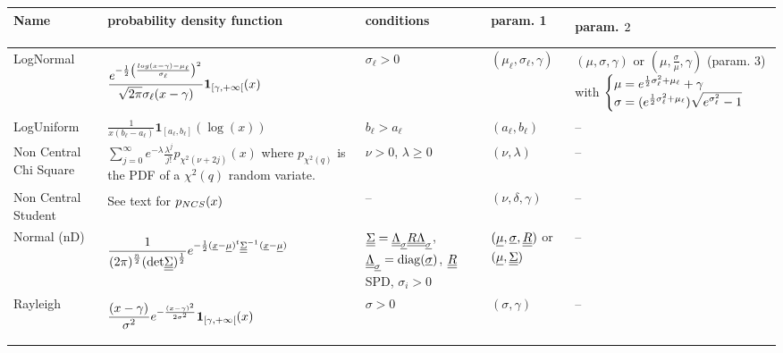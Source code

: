 {  \noindent \begin{tabular}{|p{2cm}|p{5.3cm}|p{2.7cm}|p{1.7cm}|p{4.6cm}|}
    \hline
    Name & probability density function & conditions & param. 1 & param. $2^{\strut}_{\strut}$\\
    \hline
    LogNormal & $ \displaystyle \frac{e^{-\frac{1}{2}\left(\frac{log(x-\gamma)-\mu_\ell}{\sigma_\ell}\right)^{2^{\strut}}}}{\sqrt{2\pi}\sigma_\ell (x-\gamma)}\boldsymbol{1}_{[\gamma,+\infty[}(x) $ & $\sigma_\ell >0$ & $(\mu_\ell, \sigma_\ell, \gamma)$ & $(\mu, \sigma, \gamma)$ or $(\mu, \frac{\sigma}{\mu}, \gamma)$ (param. 3) with
    $
    \left\{
      \begin{array}{@{}l@{}}
        \mu =  e^{\frac{1}{2}\sigma_\ell^2 + \mu_\ell} + \gamma\\
        \sigma =  (e^{\frac{1}{2}\sigma_\ell^2 + \mu_\ell})\sqrt{e^{\sigma_\ell^2}-1}
      \end{array}
    \right.
    $\\
    \hline
    LogUniform & $ \displaystyle \frac{1}{x(b_\ell-a_\ell)}\boldsymbol{1}_{[a_\ell, b_\ell]}(\log(x)) $ & $b_\ell > a_\ell$ & $(a_\ell, b_\ell)$ & -- \\
    \hline
    \else
    \fi
    Non Central Chi Square & $ \displaystyle \sum_{j=0}^{\infty} e^{-\lambda}\frac{\lambda^j}{j!}p_{\chi^2(\nu+2j)}(x)$ where $p_{\chi^2(q)}$ is the PDF of a $\chi^2(q)$ random variate.& $\nu>0$, $\lambda \geq 0$ & $(\nu,\lambda )$ & -- \\
    \hline
    Non Central Student & See text for $p_{NCS}(x)^{\strut}$ & -- & $(\nu,\delta, \gamma )$ & -- \\
    \hline
    Normal (nD) & $\displaystyle
    \frac{1}
    {
      \displaystyle (2\pi)^{\frac{n}{2}}(\mathrm{det}{\underline{\underline{\Sigma}}})^{\frac{1}{2}}
    }
    \displaystyle e^{-\frac{1}{2}{{({\underline{x}}-{\underline{\mu}})}^t}{\underline{\underline{\Sigma}}}^{-1^{\strut}}({\underline{x}}-{\underline{\mu}})}$
    &
    ${\underline{\underline{\Sigma}}} = {\underline{\underline{\Lambda}}}_{{\underline{\sigma}}} {\underline{\underline{R}}} {\underline{\underline{\Lambda}}}_{{\underline{\sigma}}}$, ${\underline{\underline{\Lambda}}}_{{\underline{\sigma}}} = \mathrm{diag}({\underline{\sigma}})$, ${\underline{\underline{R}}}$ SPD, $\sigma_i >0$ & $({\underline{\mu}}, {\underline{\sigma}},{\underline{\underline{R}}})$ or $({\underline{\mu}}, {\underline{\underline{\Sigma}}})$ & -- \\
    \hline
    Rayleigh & $\displaystyle \frac{(x - \gamma)^{\strut}}{\sigma^2_{\strut}}e^{-\frac{(x-\gamma)^2}{2\sigma^2}}\boldsymbol{1}_{[\gamma,+\infty[}(x)$ & $\sigma > 0$ & $(\sigma, \gamma)$ & -- \\
    \hline

\end{tabular}}
